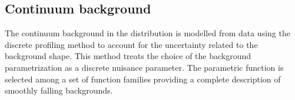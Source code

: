\subsection{Continuum background}
\label{sec:AnalyticFitting_Background}

The continuum background in the \mgg distribution is modelled from data using the discrete profiling method \cite{Dauncey_2015} to account for the uncertainty related to the background shape.
This method treats the choice of the background parametrization as a discrete nuisance parameter. The parametric function is selected among a set of function families providing a complete
description of smoothly falling backgrounds.




